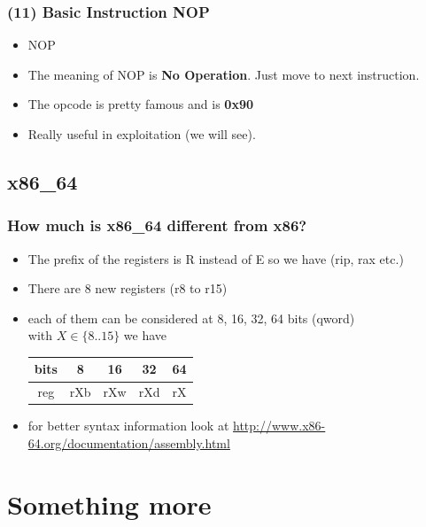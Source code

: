 \documentclass[]{beamer}
\newenvironment{changemargin}[2]{%
  \begin{list}{}{%
      \setlength{\topsep}{0pt}%
      \setlength{\leftmargin}{#1}%
      \setlength{\rightmargin}{#2}%
      \setlength{\listparindent}{\parindent}%
      \setlength{\itemindent}{\parindent}%
      \setlength{\parsep}{\parskip}%
    }%
  \item[]}{\end{list}}
\begin{document}
\begin{frame}
  \frametitle{(11) Basic Instruction NOP}
  \begin{itemize}
  \item{NOP}\\
  \item{The meaning of NOP is \textbf{No Operation}. Just move to next instruction.}
  \item{The opcode is pretty famous and is \textbf{0x90}}
  \item{Really useful in exploitation (we will see).}
  \end{itemize}
\end{frame}

\subsection{x86\_64}
\begin{frame}
  \frametitle{How much is x86\_64 different from x86?}
  \begin{changemargin}{-0.7cm}{0cm}
    \begin{itemize}
    \item{The prefix of  the registers is R instead of E so we have (rip, rax etc.)}
    \item{There are 8 new registers (r8 to r15)}
    \item{each of them can be considered at 8, 16, 32, 64 bits (qword)\\
        with $X \in \{8..15\}$ we have }
      \begin{table}[h]
        \begin{tabular}{|c!{\vrule width 1pt }c|c|c|c|}
          \hline
          bits&8&16&32&64\\
          \hline
          reg&rXb&rXw&rXd&rX\\
          \hline
        \end{tabular}
      \end{table}
    \item{for better syntax information look at \url{http://www.x86-64.org/documentation/assembly.html}}
    \end{itemize}
  \end{changemargin}
\end{frame}
\section{Something more}
\end{document}
